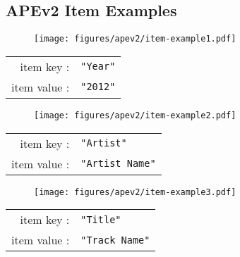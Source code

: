 \clearpage

\subsection{APEv2 Item Examples}
\begin{figure}[h]
  \texttt{[image: figures/apev2/item-example1.pdf]}
\end{figure}
\par
\noindent
\begin{tabular}{rl}
item key : & \texttt{"Year"} \\
item value : & \texttt{"2012"} \\
\end{tabular}
\begin{figure}[h]
  \texttt{[image: figures/apev2/item-example2.pdf]}
\end{figure}
\par
\noindent
\begin{tabular}{rl}
item key : & \texttt{"Artist"} \\
item value : & \texttt{"Artist Name"} \\
\end{tabular}
\begin{figure}[h]
  \texttt{[image: figures/apev2/item-example3.pdf]}
\end{figure}
\par
\noindent
\begin{tabular}{rl}
  item key : & \texttt{"Title"} \\
  item value : & \texttt{"Track Name"} \\
\end{tabular}
